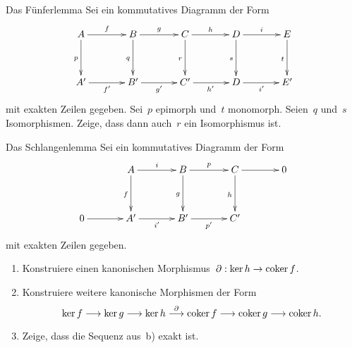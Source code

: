 \documentclass{uebblatt}
\begin{document}
\begin{aufgabe}{Das Fünferlemma}
Sei ein kommutatives Diagramm der Form
\[ \xymatrixcolsep{3pc}\xymatrixrowsep{3pc}\xymatrix{
  A \ar[r]^f \ar[d]_p & B \ar[r]^g \ar[d]_q & C \ar[r]^h \ar[d]_r & D \ar[r]^i \ar[d]_s & E \ar[d]_t \\
  A' \ar[r]_{f'} & B' \ar[r]_{g'} & C' \ar[r]_{h'} & D \ar[r]_{i'} & E'
} \]
mit exakten Zeilen gegeben. Sei~$p$ epimorph und~$t$ monomorph. Seien~$q$
und~$s$ Isomorphismen. Zeige, dass dann auch~$r$ ein Isomorphismus ist.
\end{aufgabe}

\begin{aufgabe}{Das Schlangenlemma}
Sei ein kommutatives Diagramm der Form
\[ \xymatrixcolsep{3pc}\xymatrixrowsep{3pc}\xymatrix{
  & A \ar[r]^{i} \ar[d]_f & B \ar[r]^{p} \ar[d]_g & C \ar[r] \ar[d]_h & 0 \\
  0 \ar[r] & A' \ar[r]_{i'} & B' \ar[r]_{p'} & C'
} \]
mit exakten Zeilen gegeben.
\begin{enumerate}
\item Konstruiere einen kanonischen Morphismus~$\partial : \operatorname{ker} h \to \operatorname{coker} f$.
\item Konstruiere weitere kanonische Morphismen der Form
\[ \operatorname{ker} f \longrightarrow \operatorname{ker} g \longrightarrow \operatorname{ker} h \stackrel{\partial}{\longrightarrow}
  \operatorname{coker} f \longrightarrow \operatorname{coker} g \longrightarrow \operatorname{coker} h. \]
\item Zeige, dass die Sequenz aus~b) exakt ist.
\end{enumerate}
\end{aufgabe}

\newpage
\end{document}
